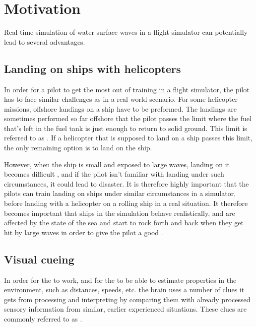 \chapter{Motivation}

Real-time simulation of water surface waves in a flight simulator can potentially lead to several advantages.

\section{Landing on ships with helicopters}

In order for a pilot to get the most out of training in a flight simulator, the pilot has to face similar challenges as in a real world scenario. For some helicopter missions, offshore landings on a ship have to be preformed. The landings are sometimes performed so far offshore that the pilot passes the limit where the fuel that's left in the fuel tank is just enough to return to solid ground. This limit is referred to as . If a helicopter that is supposed to land on a ship passes this limit, the only remaining option is to land on the ship.

However, when the ship is small \citep[such as those seen in][]{MrOawal2009,PrismDefence2010,KopulaDK2010} and exposed to large waves, landing on it becomes difficult \citep[which for example is the case in][]{PrismDefence2010}, and if the pilot isn't familiar with landing under such circumstances, it could lead to disaster. It is therefore highly important that the pilots can train landing on ships under similar circumstances in a simulator, before landing with a helicopter on a rolling ship in a real situation. It therefore becomes important that ships in the simulation behave realistically, and are affected by the state of the sea and start to rock forth and back when they get hit by large waves in order to give the pilot a good .

\section{Visual cueing}

In order for the  to work, and for the \brain to be able to estimate properties in the environment, such as distances, speeds, etc. the brain uses a number of clues it gets from processing and interpreting  by comparing them with already processed sensory information from similar, earlier experienced situations. These clues are commonly referred to as .

